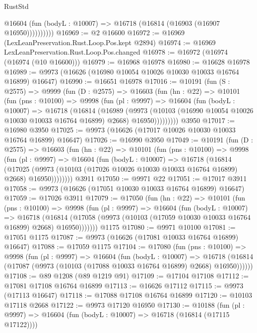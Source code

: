 \begin{lexlean}{RustStd}
\begin{coremodule}
              @16604 (fun (bodyL : @10007) => @16718 (@16814 (@16903 (@16907 @16950))))))))))
@16969 := @2 @16600
@16972 := @16969 (LexLeanPreservation.Rust.Loop.Pos.kept @2894)
@16974 := @16969 LexLeanPreservation.Rust.Loop.Pos.changed
@16978 := @16972 (@16974 (@16974 (@10 @16600)))
@16979 := @16968 @16978
@16980 := @16628 @16978
@16989 := @9973 (@16626 (@16980 @10054 @10026 @10030 @10033 @16764 @16899) @16647)
@16990 := @16651 @16978
@17016 := @10191
    (fun (S : @2575) =>
    @9999
      (fun (D : @2575) =>
      @16603
        (fun (hn : @22) =>
        @10101
          (fun (pns : @10100) =>
          @9998
            (fun (pl : @9997) =>
            @16604
              (fun (bodyL : @10007) =>
              @16718
                (@16814
                  (@16989
                    (@9973
                      (@10103 (@16990 @10054 @10026 @10030 @10033 @16764 @16899) @2668)
                      @16950)))))))))
    @3950
@17017 := @16980 @3950
@17025 := @9973 (@16626 (@17017 @10026 @10030 @10033 @16764 @16899) @16647)
@17026 := @16990 @3950
@17049 := @10191
    (fun (D : @2575) =>
    @16603
      (fun (hn : @22) =>
      @10101
        (fun (pns : @10100) =>
        @9998
          (fun (pl : @9997) =>
          @16604
            (fun (bodyL : @10007) =>
            @16718
              (@16814
                (@17025
                  (@9973 (@10103 (@17026 @10026 @10030 @10033 @16764 @16899) @2668) @16950))))))))
    @3911
@17050 := @9971 @22
@17051 := @17017 @3911
@17058 := @9973 (@16626 (@17051 @10030 @10033 @16764 @16899) @16647)
@17059 := @17026 @3911
@17079 := @17050
    (fun (hn : @22) =>
    @10101
      (fun (pns : @10100) =>
      @9998
        (fun (pl : @9997) =>
        @16604
          (fun (bodyL : @10007) =>
          @16718
            (@16814 (@17058 (@9973 (@10103 (@17059 @10030 @10033 @16764 @16899) @2668) @16950)))))))
    @1175
@17080 := @9971 @10100
@17081 := @17051 @1175
@17087 := @9973 (@16626 (@17081 @10033 @16764 @16899) @16647)
@17088 := @17059 @1175
@17104 := @17080
    (fun (pns : @10100) =>
    @9998
      (fun (pl : @9997) =>
      @16604
        (fun (bodyL : @10007) =>
        @16718 (@16814 (@17087 (@9973 (@10103 (@17088 @10033 @16764 @16899) @2668) @16950))))))
@17108 := @89 @1208 (@89 @1219 @91)
@17109 := @17104 @17108
@17112 := @17081 @17108 @16764 @16899
@17113 := @16626 @17112
@17115 := @9973 (@17113 @16647)
@17118 := @17088 @17108 @16764 @16899
@17120 := @10103 @17118 @2668
@17122 := @9973 @17120 @16950
@17130 := @10188
    (fun (pl : @9997) => @16604 (fun (bodyL : @10007) => @16718 (@16814 (@17115 @17122))))

\end{coremodule}
\end{lexlean}
